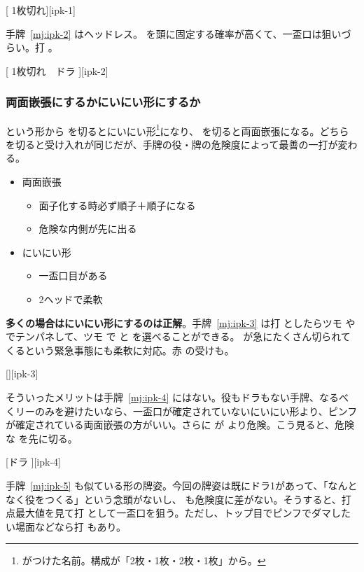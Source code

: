 \documentclass[../nankiru_main.tex]{subfiles}
\begin{document}
[ 1枚切れ][ipk-1]

手牌~\ref{mj:ipk-2} はヘッドレス。 を頭に固定する確率が高くて、一盃口は狙いづらい。打 。

[ 1枚切れ　ドラ ][ipk-2]


\subsubsection*{両面嵌張にするかにいにい形にするか}

 という形から  を切るとにいにい形\footnote{\citet{chitist-niinii}がつけた名前。構成が「2枚・1枚・2枚・1枚」から。}になり、 を切ると両面嵌張になる。どちらを切ると受け入れが同じだが、手牌の役・牌の危険度によって最善の一打が変わる。

\begin{itemize}
  \item 両面嵌張
  \begin{itemize}
    \item 面子化する時必ず順子＋順子になる
    \item 危険な内側が先に出る
  \end{itemize}
  \item にいにい形
  \begin{itemize}
    \item 一盃口目がある
    \item 2ヘッドで柔軟
  \end{itemize}
\end{itemize}

\textbf{多くの場合はにいにい形にするのは正解}。手牌~\ref{mj:ipk-3} は打  としたらツモ  や  でテンパネして、ツモ  で  と  を選べることができる。 が急にたくさん切られてくるという緊急事態にも柔軟に対応。赤  の受けも\citep[][p.~35]{zero-teyaku}。

[][ipk-3]

そういったメリットは手牌~\ref{mj:ipk-4} にはない。役もドラもない手牌、なるべくリーのみを避けたいなら、一盃口が確定されていないにいにい形より、ピンフが確定されている両面嵌張の方がいい。さらに  が  より危険。こう見ると、危険な  を先に切る\citep[][p.~35]{zero-teyaku}。

[ドラ ][ipk-4]

手牌~\ref{mj:ipk-5} も似ている形の牌姿。今回の牌姿は既にドラ1があって、「なんとなく役をつくる」という念頭がないし、 も危険度に差がない。そうすると、打点最大値を見て打  として一盃口を狙う\citep[][pp.~120--121]{uzaku-haikouritsu}。ただし、トップ目でピンフでダマしたい場面などなら打  もあり。
\end{document}
